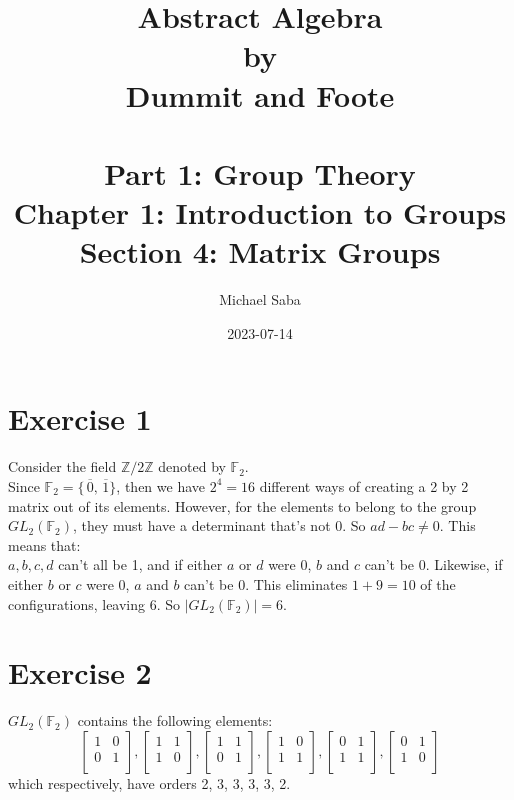 \documentclass{article}
\title{%
    \Huge Abstract Algebra \\
    \large by \\
    \Large Dummit and Foote \\~\\
    \huge Part 1: Group Theory \\
    \LARGE Chapter 1: Introduction to Groups \\
    \Large Section 4: Matrix Groups
}
\date{2023-07-14}
\author{Michael Saba}
\newcommand{\Z}{\mathbb{Z}}
\newcommand{\F}{\mathbb{F}}
\newcommand{\olsi}[1]{\,\overline{\!{#1}}}
\begin{document}
    \maketitle
    \newpage


    \section*{Exercise 1}
    Consider the field $\Z/2\Z$ denoted by $\F_2$. \\
    Since $\F_2 = \{\olsi{0}, \olsi{1}\}$,
    then we have $2^4 = 16$ different ways of creating a 2 by 2 matrix out of its
    elements.
    However, for the elements to belong to the group $GL_2(\F_2)$,
    they must have a determinant that's not 0.
    So $ad - bc \neq 0$. This means that: \\
    $a, b, c, d$ can't all be 1,
    and if either $a$ or $d$ were 0, $b$ and $c$ can't be 0.
    Likewise, if either $b$ or $c$ were 0, $a$ and $b$ can't be 0.
    This eliminates $1 + 9 = 10$ of the configurations, leaving 6.
    So $|GL_2(\F_2)| = 6$.


    \section*{Exercise 2}
    $GL_2(\F_2)$ contains the following elements: \\
    \[ \begin{bmatrix}
        1 & 0 \\
        0 & 1 \\
    \end{bmatrix},
    \begin{bmatrix}
        1 & 1 \\
        1 & 0 \\
    \end{bmatrix},
    \begin{bmatrix}
        1 & 1 \\
        0 & 1 \\
    \end{bmatrix},
    \begin{bmatrix}
        1 & 0 \\
        1 & 1 \\
    \end{bmatrix},
    \begin{bmatrix}
        0 & 1 \\
        1 & 1 \\
    \end{bmatrix},
    \begin{bmatrix}
        0 & 1 \\
        1 & 0 \\
    \end{bmatrix} \]
    which respectively, have orders 2, 3, 3, 3, 3, 2.
\end{document}
